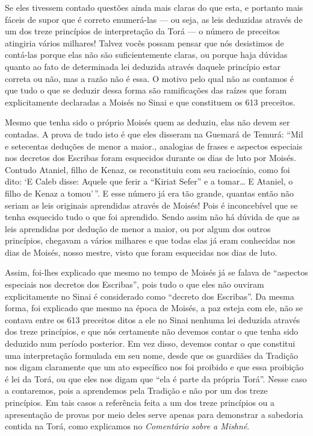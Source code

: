 Se eles tivessem contado questões ainda mais claras do que esta, e
portanto mais fáceis de supor que é correto enumerá-las --- ou seja, as
leis deduzidas através de um dos treze princípios de interpretação da
Torá --- o número de preceitos atingiria vários milhares! Talvez vocês
possam pensar que nós desistimos de contá-las porque elas não são
suficientemente claras, ou porque haja dúvidas quanto ao fato de
determinada lei deduzida através daquele princípio estar correta ou não,
mas a razão não é essa. O motivo pelo qual não as contamos é que tudo o
que se deduzir dessa forma são ramificações das raízes que foram
explicitamente declaradas a Moisés no Sinai e que constituem os 613
preceitos.

Mesmo que tenha sido o próprio Moisés quem as deduziu, elas não devem
ser contadas. A prova de tudo isto é que eles disseram na Guemará de
Temurá: ``Mil e setecentas deduções de menor a maior., analogias de
frases e aspectos especiais nos decretos dos Escribas foram esquecidos
durante os dias de luto por Moisés. Contudo Ataniel, filho de Kenaz, os
reconstituiu com seu raciocínio, como foi dito: `E Caleb disse: Aquele
que ferir a ``Kiriat Sefer'' e a tomar\ldots{} E Ataniel, o filho de Kenaz a
tomou'\,''. E esse número já era tão grande, quantas então não seriam as
leis originais aprendidas através de Moisés! Pois é inconcebível que se
tenha esquecido tudo o que foi aprendido. Sendo assim não há dúvida de
que as leis aprendidas por dedução de menor a maior, ou por algum dos
outros princípios, chegavam a vários milhares e que todas elas já eram
conhecidas nos dias de Moisés, nosso mestre, visto que foram esquecidas
nos dias de luto.

Assim, foi-lhes explicado que mesmo no tempo de Moisés já se falava de
``aspectos especiais nos decretos dos Escribas'', pois tudo o que eles
não ouviram explicitamente no Sinai é considerado como ``decreto dos
Escribas''. Da mesma forma, foi explicado que mesmo na época de Moisés,
a paz esteja com ele, não se contava entre os 613 preceitos ditos a ele
no Sinai nenhuma lei deduzida através dos treze princípios, e que nós
certamente não devemos contar o que tenha sido deduzido num período
posterior. Em vez disso, devemos contar o que constitui uma
interpretação formulada em seu nome, desde que os guardiães da Tradição
nos digam claramente que um ato específico nos foi proibido e que essa
proibição é lei da Torá, ou que eles nos digam que ``ela é parte da
própria Torá''. Nesse caso a contaremos, pois a aprendemos pela
Tradição e não por um dos treze princípios. Em tais casos a referência
feita a um dos treze princípios ou a apresentação de provas por meio
deles serve apenas para demonstrar a sabedoria contida na Torá, como
explicamos no \emph{Comentário sobre a Mishné}.

